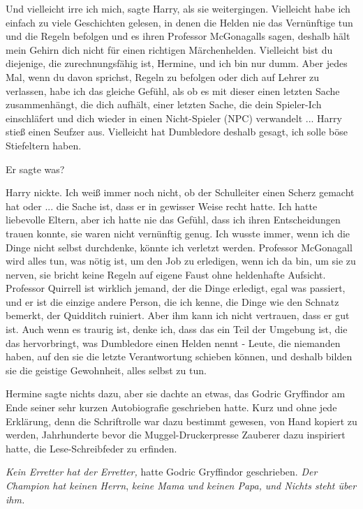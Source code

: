 \glqq{}Und vielleicht irre ich mich\grqq{}, sagte Harry, als sie weitergingen.
\glqq{}Vielleicht habe ich einfach zu viele Geschichten gelesen, in denen die
Helden nie das Vernünftige tun und die Regeln befolgen und es ihren Professor
McGonagalls sagen, deshalb hält mein Gehirn dich nicht für einen richtigen
Märchenhelden. Vielleicht bist du diejenige, die zurechnungsfähig ist, Hermine,
und ich bin nur dumm. Aber jedes Mal, wenn du davon sprichst, Regeln zu befolgen
oder dich auf Lehrer zu verlassen, habe ich das gleiche Gefühl, als ob es mit
dieser einen letzten Sache zusammenhängt, die dich aufhält, einer letzten Sache,
die dein Spieler-Ich einschläfert und dich wieder in einen Nicht-Spieler (NPC)
verwandelt ...\grqq{} Harry stieß einen Seufzer aus. \glqq{}Vielleicht hat
Dumbledore deshalb gesagt, ich solle böse Stiefeltern haben.\grqq{}

\glqq{}Er sagte was?\grqq{}

Harry nickte. \glqq{}Ich weiß immer noch nicht, ob der Schulleiter einen Scherz
gemacht hat oder ... die Sache ist, dass er in gewisser Weise recht hatte. Ich
hatte liebevolle Eltern, aber ich hatte nie das Gefühl, dass ich ihren
Entscheidungen trauen konnte, sie waren nicht vernünftig genug. Ich wusste
immer, wenn ich die Dinge nicht selbst durchdenke, könnte ich verletzt werden.
Professor McGonagall wird alles tun, was nötig ist, um den Job zu erledigen,
wenn ich da bin, um sie zu nerven, sie bricht keine Regeln auf eigene Faust ohne
heldenhafte Aufsicht. Professor Quirrell ist wirklich jemand, der die Dinge
erledigt, egal was passiert, und er ist die einzige andere Person, die ich
kenne, die Dinge wie den Schnatz bemerkt, der Quidditch ruiniert. Aber ihm kann
ich nicht vertrauen, dass er gut ist. Auch wenn es traurig ist, denke ich, dass
das ein Teil der Umgebung ist, die das hervorbringt, was Dumbledore einen Helden
nennt - Leute, die niemanden haben, auf den sie die letzte Verantwortung
schieben können, und deshalb bilden sie die geistige Gewohnheit, alles selbst zu
tun.\grqq{}

Hermine sagte nichts dazu, aber sie dachte an etwas, das Godric Gryffindor am
Ende seiner sehr kurzen Autobiografie geschrieben hatte. Kurz und ohne jede
Erklärung, denn die Schriftrolle war dazu bestimmt gewesen, von Hand kopiert zu
werden, Jahrhunderte bevor die Muggel-Druckerpresse Zauberer dazu inspiriert
hatte, die Lese-Schreibfeder zu erfinden.

\emph{Kein Erretter hat der Erretter,} hatte Godric Gryffindor geschrieben.
\emph{Der Champion hat keinen Herrn},
\emph{keine Mama und keinen Papa,}
\emph{und Nichts steht über ihm.}

